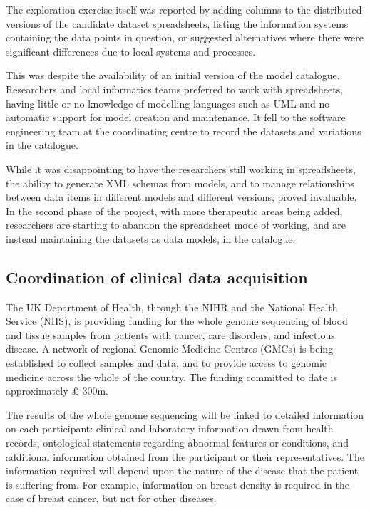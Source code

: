 The exploration exercise itself was reported by adding columns to the
distributed versions of the candidate dataset spreadsheets, listing
the information systems containing the data points in question, or
suggested alternatives where there were significant differences due to
local systems and processes.

This was despite the availability of an initial version of the model
catalogue.  Researchers and local informatics teams preferred to work
with spreadsheets, having little or no knowledge of modelling
languages such as UML and no automatic support for model creation and
maintenance.  It fell to the software engineering team at the
coordinating centre to record the datasets and variations in the
catalogue.

While it was disappointing to have the researchers still working in
spreadsheets, the ability to generate XML schemas from models, and to
manage relationships between data items in different models and
different versions, proved invaluable.  In the second phase of the
project, with more therapeutic areas being added, researchers are
starting to abandon the spreadsheet mode of working, and are instead
maintaining the datasets as data models, in the catalogue.

\subsection{Coordination of clinical data acquisition}

The UK Department of Health, through the NIHR and the National Health
Service (NHS), is providing funding for the whole genome sequencing of
blood and tissue samples from patients with cancer, rare disorders,
and infectious disease.  A network of regional Genomic Medicine
Centres (GMCs) is being established to collect samples and data, and
to provide access to genomic medicine across the whole of the
country.  The funding committed to date is approximately \pounds
300m. 

The results of the whole genome sequencing will be linked to detailed
information on each participant: clinical and laboratory information
drawn from health records, ontological statements regarding abnormal
features or conditions, and additional information obtained from the
participant or their representatives.  The information required will
depend upon the nature of the disease that the patient is suffering
from.  For example, information on breast density is required in the
case of breast cancer, but not for other diseases.

